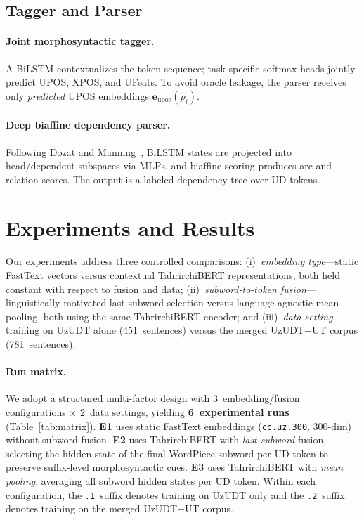 \documentclass[runningheads]{llncs}
\begin{document}
\subsection{Tagger and Parser}
\label{sec:method_models}

\paragraph{Joint morphosyntactic tagger.}
A BiLSTM contextualizes the token sequence; task-specific softmax heads jointly predict UPOS, XPOS, and UFeats.
To avoid oracle leakage, the parser receives only \emph{predicted} UPOS embeddings $\mathbf{e}_{\text{upos}}(\hat{p}_i)$.

\paragraph{Deep biaffine dependency parser.}
Following Dozat and Manning~\cite{DBLP:conf/iclr/DozatM17}, BiLSTM states are projected into head/dependent subspaces via MLPs, and biaffine scoring produces arc and relation scores. The output is a labeled dependency tree over UD tokens.

\section{Experiments and Results}
\label{sec:experiments}

Our experiments address three controlled comparisons:
(i)~\emph{embedding type}---static FastText vectors versus contextual TahrirchiBERT representations, both held constant with respect to fusion and data;
(ii)~\emph{subword-to-token fusion}---linguistically-motivated last-subword selection versus language-agnostic mean pooling, both using the same TahrirchiBERT encoder;
and (iii)~\emph{data setting}---training on UzUDT alone (451~sentences) versus the merged UzUDT+UT corpus (781~sentences).

\paragraph{Run matrix.}
We adopt a structured multi-factor design with $3$~embedding/fusion configurations $\times$ $2$~data settings, yielding \textbf{6~experimental runs} (Table~\ref{tab:matrix}).
\textbf{E1} uses static FastText embeddings (\texttt{cc.uz.300}, 300-dim) without subword fusion.
\textbf{E2} uses TahrirchiBERT with \emph{last-subword} fusion, selecting the hidden state of the final WordPiece subword per UD token to preserve suffix-level morphosyntactic cues.
\textbf{E3} uses TahrirchiBERT with \emph{mean pooling}, averaging all subword hidden states per UD token.
Within each configuration, the \texttt{.1}~suffix denotes training on UzUDT only and the \texttt{.2}~suffix denotes training on the merged UzUDT+UT corpus.
\end{document}
